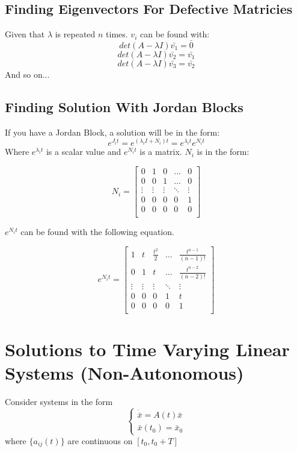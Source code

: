 \documentclass[12pt]{article}
\begin{document}
\subsection*{Finding Eigenvectors For Defective Matricies}
Given that $\lambda$ is repeated $n$ times. $v_i$ can be found with:
$$det(A-\lambda I)\bar{v_1}=\bar{0}$$
$$det(A-\lambda I)\bar{v_2}=\bar{v_1}$$
$$det(A-\lambda I)\bar{v_3}=\bar{v_2}$$
And so on...
\subsection*{Finding Solution With Jordan Blocks}
If you have a Jordan Block, a solution will be in the form:
$$e^{J_it}=e^{(\lambda_iI+N_i)t}=e^{\lambda_it}e^{N_it}$$
Where $e^{\lambda_it}$ is a scalar value and $e^{N_it}$ is a matrix. $N_i$ is in the form:

$$
N_i=\begin{bmatrix} 
0 & 1 & 0 & \dots & 0 \\
0 & 0 & 1 & \dots & 0 \\
\vdots & \vdots & \vdots & \ddots & \vdots \\
0 & 0 & 0 & 0 & 1 \\
0 & 0 & 0 & 0 & 0\\
\end{bmatrix}
$$

$e^{N_it}$ can be found with the following equation.

$$e^{N_it}=\begin{bmatrix} 1 & t & \frac{t^2}{2} & \dots & \frac{t^{n-1}}{(n-1)!} \\
0 & 1 & t & \dots & \frac{t^{n-2}}{(n-2)!} \\
\vdots & \vdots & \vdots & \ddots & \vdots \\
0 & 0 & 0 & 1 & t \\
0 & 0 & 0 & 0 & 1\\
\end{bmatrix}$$ 

\newpage
\section*{Solutions to Time Varying Linear Systems (Non-Autonomous)}
Consider systems in the form 
$$ 
\begin{cases}
\dot{\bar{x}}=A(t)\bar{x} \\
\bar{x}(t_0)=\bar{x}_0
\end{cases}
$$
where $\{a_{ij}(t)\}$ are continuous on $[t_0,t_0+T]$ \\
\end{document}
